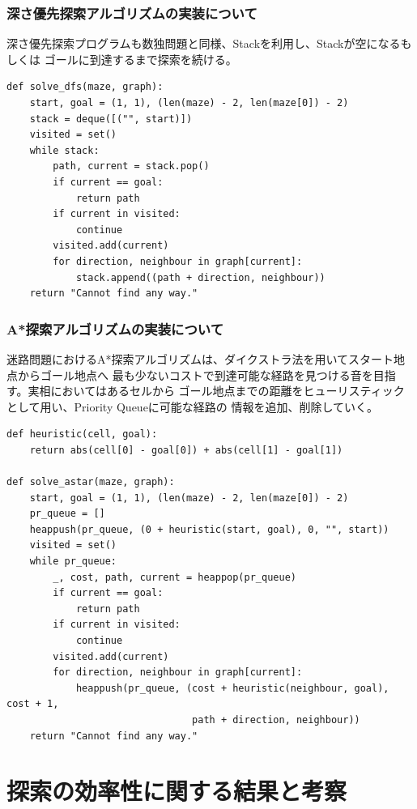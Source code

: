\documentclass[uplatex]{jsarticle}
\begin{document}
\subsubsection{深さ優先探索アルゴリズムの実装について}
深さ優先探索プログラムも数独問題と同様、Stackを利用し、Stackが空になるもしくは
ゴールに到達するまで探索を続ける。

\begin{lstlisting}[basicstyle=\ttfamily\footnotesize, frame=single]
def solve_dfs(maze, graph):
    start, goal = (1, 1), (len(maze) - 2, len(maze[0]) - 2)
    stack = deque([("", start)])
    visited = set()
    while stack:
        path, current = stack.pop()
        if current == goal:
            return path
        if current in visited:
            continue
        visited.add(current)
        for direction, neighbour in graph[current]:
            stack.append((path + direction, neighbour))
    return "Cannot find any way."
\end{lstlisting}

\subsubsection{A*探索アルゴリズムの実装について}
迷路問題におけるA*探索アルゴリズムは、ダイクストラ法を用いてスタート地点からゴール地点へ
最も少ないコストで到達可能な経路を見つける音を目指す。実相においてはあるセルから
ゴール地点までの距離をヒューリスティックとして用い、Priority Queueに可能な経路の
情報を追加、削除していく。

\begin{lstlisting}[basicstyle=\ttfamily\footnotesize, frame=single]
def heuristic(cell, goal):
    return abs(cell[0] - goal[0]) + abs(cell[1] - goal[1])

def solve_astar(maze, graph):
    start, goal = (1, 1), (len(maze) - 2, len(maze[0]) - 2)
    pr_queue = []
    heappush(pr_queue, (0 + heuristic(start, goal), 0, "", start))
    visited = set()
    while pr_queue:
        _, cost, path, current = heappop(pr_queue)
        if current == goal:
            return path
        if current in visited:
            continue
        visited.add(current)
        for direction, neighbour in graph[current]:
            heappush(pr_queue, (cost + heuristic(neighbour, goal), cost + 1,
                                path + direction, neighbour))
    return "Cannot find any way."

\end{lstlisting}

\section{探索の効率性に関する結果と考察}
\end{document}
